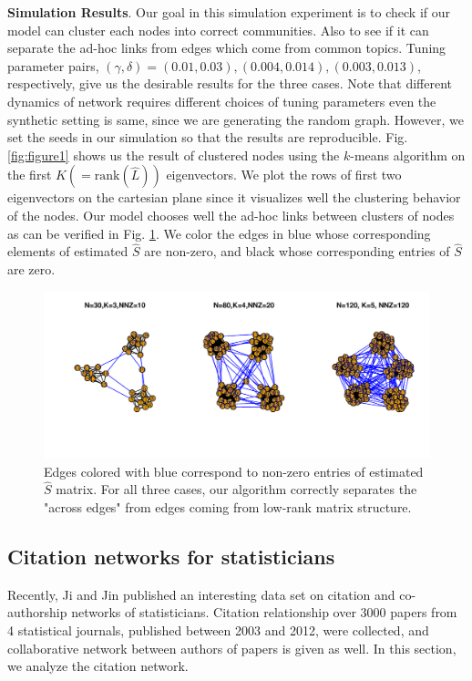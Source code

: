 \documentclass[AMS,STIX1COL]{WileyNJD-v2}
\begin{document}
\textbf{Simulation Results}.
Our goal in this simulation experiment is to check if our model can cluster each nodes into correct communities.
Also to see if it can separate the ad-hoc links from edges which come from common topics.
Tuning parameter pairs, $(\gamma,\delta) = (0.01,0.03),(0.004,0.014),(0.003,0.013)$, respectively, give us the desirable results for the three cases.
Note that different dynamics of network requires different choices of tuning parameters even the synthetic setting is same, since we are generating the random graph.
However, we set the seeds in our simulation so that the results are reproducible.
Fig. \ref{fig:figure1} shows us the result of clustered nodes using the $k$-means algorithm on the first $K(=\mbox{rank}(\widehat{L}))$ eigenvectors.
We plot the rows of first two eigenvectors on the cartesian plane since it visualizes well the clustering behavior of the nodes.
Our model chooses well the ad-hoc links between clusters of nodes as can be verified in Fig. \ref{fig:figure2}.
We color the edges in blue whose corresponding elements of estimated $\widehat{S}$ are non-zero, and black whose corresponding entries of $\widehat{S}$ are zero.

\begin{figure}[htbp]
\begin{center}
\includegraphics[scale=0.75]{Fig2.pdf}
\caption{Edges colored with blue correspond to non-zero entries of estimated $\widehat{S}$ matrix.
For all three cases, our algorithm correctly separates the "across edges" from edges coming from low-rank matrix structure.}
\label{fig:figure2}
\end{center}
\end{figure}

\subsection{Citation networks for statisticians }
Recently, Ji and Jin \cite{ji2016coauthorship} published an interesting data set on citation  and co-authorship networks of statisticians.
Citation relationship over 3000 papers from 4 statistical journals, published between 2003 and 2012, were collected, and collaborative network between authors of papers is given as well.
In this section, we analyze the citation network. \\
\end{document}
